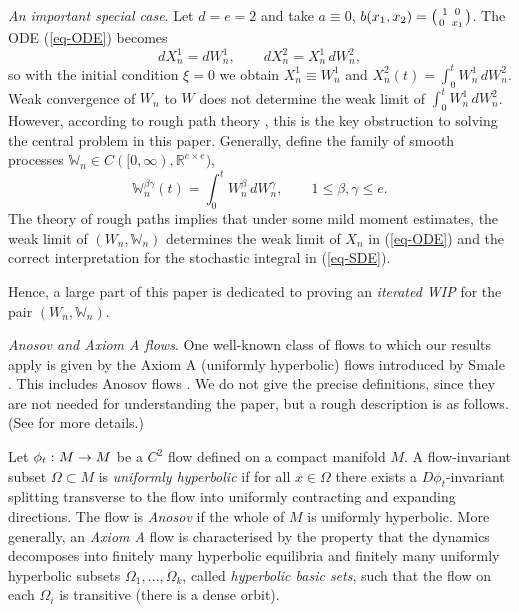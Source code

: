 \documentclass[aop,MSNbibl,seceqn,dvips]{arximspdf}
\newcommand{\eqref}[1]{(\ref{#1})}
\newcommand{\R}{\mathbb{R}}
\newcommand{\BBW}{\mathbb{W}}
\begin{document}
\textit{An important special case}.
Let $d=e=2$ and take $a\equiv0$, $b(x_1,x_2)= \bigl(
%
{1 \enskip 0 \atop 0 \enskip x_1} \bigr)$.
The ODE \eqref{eq-ODE} becomes
%
\[
dX_n^1=dW_n^1,\qquad
dX_n^2 = X_n^1
\,dW_n^2,
\]
%
so with the initial condition\vspace*{1pt} $\xi=0$ we obtain $X_n^1\equiv W_n^1$ and
$X_n^2(t)=\int_0^t W_n^1 \,dW_n^2$.
Weak convergence of $W_n$ to $W$ does not determine the weak limit of
$\int_0^t W_n^1 \,dW_n^2$.
However,
according to rough path theory \cite{Lyons98}, this is the key
obstruction to solving the central problem in this paper.
Generally, define the family of smooth processes $\BBW_n\in
C([0,\infty
),\R^{e\times e})$,
%
\begin{equation}
\label{eq-WW} \BBW_n^{\beta\gamma}(t)=\int_0^t
W_n^\beta \,dW_n^\gamma,\qquad 1\le \beta,
\gamma\le e.
\end{equation}
%
The theory of rough paths implies that under some mild moment estimates,
the weak limit of $(W_n,\BBW_n)$ determines the weak limit of $X_n$
in \eqref{eq-ODE} and the correct interpretation for the stochastic
integral in \eqref{eq-SDE}.

Hence, a large part of this paper is dedicated to proving an \emph
{iterated WIP} for the pair $(W_n,\BBW_n)$.

\textit{Anosov and Axiom A flows}.
One well-known class of flows to which our results apply is given by
the Axiom A (uniformly hyperbolic) flows introduced by Smale \cite{Smale67}.
This includes Anosov flows \cite{Anosov67}. We do not give the precise
definitions, since they are not needed for understanding the paper, but
a rough description is as follows. (See \cite{Ruelle78,Bowen75,Sinai72}
for more details.)

Let $\phi_t\dvtx M\to M$ be a $C^2$ flow defined on a compact manifold $M$.
A flow-invariant subset $\Omega\subset M$ is \emph{uniformly hyperbolic}
if for all
$x\in\Omega$ there exists a $D\phi_t$-invariant splitting transverse to
the flow into uniformly contracting and expanding directions.
The flow is \emph{Anosov} if the whole of $M$ is uniformly hyperbolic.
More generally, an \emph{Axiom A} flow is characterised by the property
that the dynamics decomposes into finitely many hyperbolic equilibria
and finitely many uniformly hyperbolic subsets $\Omega_1,\ldots
,\Omega
_k$, called \emph{hyperbolic basic sets}, such that the flow on each
$\Omega_i$ is transitive (there is a dense orbit).
\end{document}
